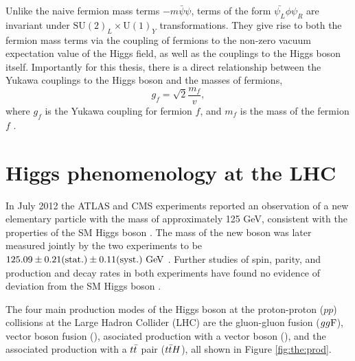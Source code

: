 Unlike the naive fermion mass terms $-m \bar{\psi}\psi$, terms of the form $\bar{\psi_L}\phi\psi_R$ 
are invariant under $\text{SU}(2)_L \times \text{U}(1)_Y$ transformations. They give rise to both the fermion mass terms
via the coupling of fermions to the non-zero vacuum expectation value of the Higgs field,
as well as the couplings to the Higgs boson itself. Importantly for this thesis, there is 
a direct relationship between the Yukawa couplings to the Higgs boson and the
masses of fermions,
\begin{equation}
g_f = \sqrt{2}\frac{m_f}{v},
\end{equation}
where $g_f$ is the Yukawa coupling for fermion $f$, and $m_f$ is the mass of the fermion $f$ 
\cite{Thomson:2013zua}.

\section{Higgs phenomenology at the LHC}

In July 2012 the ATLAS and CMS experiments reported an observation of a new elementary particle with the
mass of approximately 125 GeV, consistent with the properties of the SM Higgs boson
\cite{Aad:2012tfa, Chatrchyan:2012xdj}. The mass of the new boson was later measured
jointly by the two experiments to be $125.09 \pm 0.21 (\text{stat.}) \pm 0.11 (\text{syst.})~\text{Ge\kern -0.1em V}$
\cite{Aad:2015zhl}. Further studies of spin, parity, and production
and decay rates in both experiments have found no evidence of deviation from the SM
Higgs boson \cite{Aad:2015mxa, PhysRevD.92.012004, Khachatryan:2016vau, Aad:2019mbh}.

The four main production modes of the Higgs boson at the proton-proton ($pp$) collisions
at the Large Hadron Collider (LHC) are the gluon-gluon fusion ($gg\text{F}$), vector boson fusion
(\vbf), asociated production with a vector boson (\vh), and the associated production with
a $t\bar{t}$ pair ($t\bar{t} H$), all shown in Figure \ref{fig:the:prod}.

